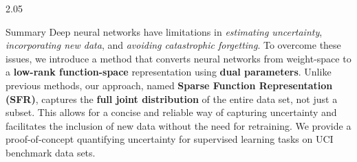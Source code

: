 \documentclass[final,12pt]{beamer}
\newlength{\sepwidth}
\newlength{\colwidth}
\newcommand{\separatorcolumn}{\begin{column}{\sepwidth}\end{column}}
\begin{document}
\begin{frame}[t]
\begin{columns}[t]
\begin{column}{2.05\colwidth}
\vspace{-0.8cm}
\begin{alertblock}{Summary}
Deep neural networks have limitations in \textit{estimating uncertainty}, \textit{incorporating new data}, and \textit{avoiding catastrophic forgetting}. To overcome these issues, we introduce a method that converts neural networks from weight-space to a \alert{\bf low-rank function-space} representation using \alert{\bf dual parameters}. Unlike previous methods, our approach, named \alert{\bf Sparse Function Representation (SFR)}, captures the \alert{\bf full joint distribution} of the entire data set, not just a subset. This allows for a concise and reliable way of capturing uncertainty and facilitates the inclusion of new data without the need for retraining. We provide a proof-of-concept quantifying uncertainty for supervised learning tasks on UCI benchmark data sets.
  \end{alertblock}\end{column}
\end{columns}
\begin{columns}[t]


\separatorcolumn


\end{columns}
\end{frame}
\end{document}
